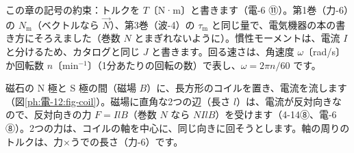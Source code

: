 \begin{omoidasou}
\end{omoidasou}

\noindent この章の記号の約束：トルクを $T$〔N·m〕と書きます（電-6 ⑪）。第1巻（力-6）の $N_{\mathrm m}$（ベクトルなら $\vec N$）、第3巻（波-4）の $\tau_{\mathrm m}$ と同じ量で、電気機器の本の書き方にそろえました（巻数 $N$ とまぎれないように）。慣性モーメントは、電流 $I$ と分けるため、カタログと同じ $J$ と書きます。回る速さは、角速度 $\omega$〔rad/s〕か回転数 $n$〔min$^{-1}$〕（1分あたりの回転の数）で表し、$\omega=2\pi n/60$ です。



\label{ph:電-12:sec1}
磁石の N 極と S 極の間（磁場 $B$）に、長方形のコイルを置き、電流を流します（図\ref{ph:電-12:fig-coil}）。磁場に直角な2つの辺（長さ $l$）は、電流が反対向きなので、反対向きの力 $F=IlB$（巻数 $N$ なら $NIlB$）を受けます（4-14⑧、電-6 ⑧）。2つの力は、コイルの軸を中心に、同じ向きに回そうとします。軸の周りのトルクは、力×うでの長さ（力-6）です。

